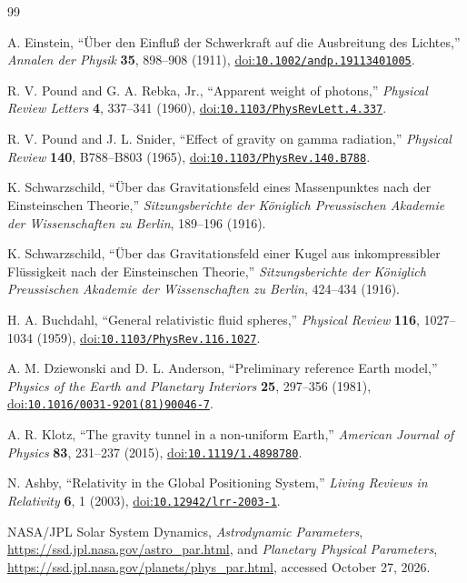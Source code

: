 \documentclass[12pt]{article}
\begin{document}
\begin{thebibliography}{99}
\small
{}
\raggedright
{}

A. Einstein,
``\"Uber den Einflu\ss{} der Schwerkraft auf die Ausbreitung des Lichtes,''
\emph{Annalen der Physik} \textbf{35}, 898--908 (1911),
\href{https://doi.org/10.1002/andp.19113401005}{doi:\nolinkurl{10.1002/andp.19113401005}}.

R. V. Pound and G. A. Rebka, Jr.,
``Apparent weight of photons,''
\emph{Physical Review Letters} \textbf{4}, 337--341 (1960),
\href{https://doi.org/10.1103/PhysRevLett.4.337}{doi:\nolinkurl{10.1103/PhysRevLett.4.337}}.

R. V. Pound and J. L. Snider,
``Effect of gravity on gamma radiation,''
\emph{Physical Review} \textbf{140}, B788--B803 (1965),
\href{https://doi.org/10.1103/PhysRev.140.B788}{doi:\nolinkurl{10.1103/PhysRev.140.B788}}.

K. Schwarzschild,
``\"Uber das Gravitationsfeld eines Massenpunktes nach der Einsteinschen Theorie,''
\emph{Sitzungsberichte der K\"oniglich Preussischen Akademie der Wissenschaften zu Berlin}, 189--196 (1916).

K. Schwarzschild,
``\"Uber das Gravitationsfeld einer Kugel aus inkompressibler Fl\"ussigkeit nach der Einsteinschen Theorie,''
\emph{Sitzungsberichte der K\"oniglich Preussischen Akademie der Wissenschaften zu Berlin}, 424--434 (1916).

H. A. Buchdahl,
``General relativistic fluid spheres,''
\emph{Physical Review} \textbf{116}, 1027--1034 (1959),
\href{https://doi.org/10.1103/PhysRev.116.1027}{doi:\nolinkurl{10.1103/PhysRev.116.1027}}.

A. M. Dziewonski and D. L. Anderson,
``Preliminary reference Earth model,''
\emph{Physics of the Earth and Planetary Interiors} \textbf{25}, 297--356 (1981),
\href{https://doi.org/10.1016/0031-9201(81)90046-7}{doi:\nolinkurl{10.1016/0031-9201(81)90046-7}}.

A. R. Klotz,
``The gravity tunnel in a non-uniform Earth,''
\emph{American Journal of Physics} \textbf{83}, 231--237 (2015),
\href{https://doi.org/10.1119/1.4898780}{doi:\nolinkurl{10.1119/1.4898780}}.

N. Ashby,
``Relativity in the Global Positioning System,''
\emph{Living Reviews in Relativity} \textbf{6}, 1 (2003),
\href{https://doi.org/10.12942/lrr-2003-1}{doi:\nolinkurl{10.12942/lrr-2003-1}}.

NASA/JPL Solar System Dynamics,
\emph{Astrodynamic Parameters},
\url{https://ssd.jpl.nasa.gov/astro_par.html}, and
\emph{Planetary Physical Parameters},
\url{https://ssd.jpl.nasa.gov/planets/phys_par.html},
accessed October 27, 2026.

\end{thebibliography}
\end{document}
